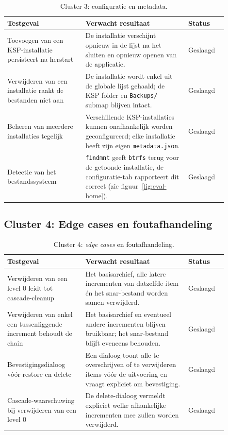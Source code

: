 \begin{table}[h]
    \centering
    \small
    \begin{tabular}{p{0.32\linewidth}p{0.42\linewidth}p{0.16\linewidth}}
        \toprule
        \textbf{Testgeval} & \textbf{Verwacht resultaat} & \textbf{Status} \\
        \midrule
        Toevoegen van een KSP-installatie persisteert na herstart & De installatie verschijnt opnieuw in de lijst na het sluiten en opnieuw openen van de applicatie. & Geslaagd \\
        Verwijderen van een installatie raakt de bestanden niet aan & De installatie wordt enkel uit de globale lijst gehaald; de KSP-folder en \texttt{Backups/}-submap blijven intact. & Geslaagd \\
        Beheren van meerdere installaties tegelijk & Verschillende KSP-installaties kunnen onafhankelijk worden geconfigureerd; elke installatie heeft zijn eigen \texttt{metadata.json}. & Geslaagd \\
        Detectie van het bestandssysteem & \texttt{findmnt} geeft \texttt{btrfs} terug voor de getoonde installatie, de configuratie-tab rapporteert dit correct (zie figuur~\ref{fig:eval-home}). & Geslaagd \\
        \bottomrule
    \end{tabular}
    \caption{Cluster 3: configuratie en metadata.}
    \label{tab:eval-cluster3}
\end{table}

\subsection{Cluster 4: Edge cases en foutafhandeling}

\begin{table}[h]
    \centering
    \small
    \begin{tabular}{p{0.32\linewidth}p{0.42\linewidth}p{0.16\linewidth}}
        \toprule
        \textbf{Testgeval} & \textbf{Verwacht resultaat} & \textbf{Status} \\
        \midrule
        Verwijderen van een level 0 leidt tot cascade-cleanup & Het basisarchief, alle latere incrementen van datzelfde item én het snar-bestand worden samen verwijderd. & Geslaagd \\
        Verwijderen van enkel een tussenliggende increment behoudt de chain & Het basisarchief en eventueel andere incrementen blijven bruikbaar; het snar-bestand blijft eveneens behouden. & Geslaagd \\
        Bevestigingsdialoog vóór restore en delete & Een dialoog toont alle te overschrijven of te verwijderen items vóór de uitvoering en vraagt expliciet om bevestiging. & Geslaagd \\
        Cascade-waarschuwing bij verwijderen van een level 0 & De delete-dialoog vermeldt expliciet welke afhankelijke incrementen mee zullen worden verwijderd. & Geslaagd \\
        \bottomrule
    \end{tabular}
    \caption{Cluster 4: \textit{edge cases} en foutafhandeling.}
    \label{tab:eval-cluster4}
\end{table}

